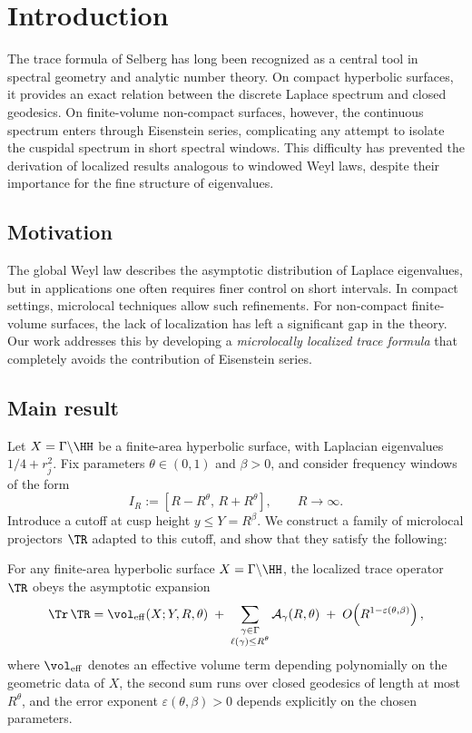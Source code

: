 \section{Introduction}
\label{sec:intro}

The trace formula of Selberg has long been recognized as a central tool in spectral geometry and analytic number theory. 
On compact hyperbolic surfaces, it provides an exact relation between the discrete Laplace spectrum and closed geodesics. 
On finite-volume non-compact surfaces, however, the continuous spectrum enters through Eisenstein series, complicating any attempt to isolate the cuspidal spectrum in short spectral windows. 
This difficulty has prevented the derivation of localized results analogous to windowed Weyl laws, despite their importance for the fine structure of eigenvalues.

\subsection{Motivation}
The global Weyl law describes the asymptotic distribution of Laplace eigenvalues, but in applications one often requires finer control on short intervals. 
In compact settings, microlocal techniques allow such refinements. 
For non-compact finite-volume surfaces, the lack of localization has left a significant gap in the theory. 
Our work addresses this by developing a \emph{microlocally localized trace formula} that completely avoids the contribution of Eisenstein series. 

\subsection{Main result}
Let $X = \Gamma \backslash \HH$ be a finite-area hyperbolic surface, with Laplacian eigenvalues $1/4 + r_j^2$. 
Fix parameters $\theta \in (0,1)$ and $\beta > 0$, and consider frequency windows of the form
\[
  I_R := [R - R^\theta, \, R + R^\theta], 
  \qquad R \to \infty.
\]
Introduce a cutoff at cusp height $y \leq Y = R^\beta$. 
We construct a family of microlocal projectors $\TR$ adapted to this cutoff, and show that they satisfy the following:

\begin{theorem}\label{thm:main}
For any finite-area hyperbolic surface $X = \Gamma \backslash \HH$, the localized trace operator $\TR$ obeys the asymptotic expansion
\[
  \Tr \, \TR = \vol_{\mathrm{eff}}(X;Y,R,\theta) 
  \;+\; \sum_{\substack{\gamma \in \Gamma \\ \ell(\gamma) \leq R^\theta}} 
  \mathcal{A}_\gamma(R,\theta) 
  \;+\; O\!\left( R^{1-\varepsilon(\theta,\beta)} \right),
\]
where $\vol_{\mathrm{eff}}$ denotes an effective volume term depending polynomially on the geometric data of $X$, 
the second sum runs over closed geodesics of length at most $R^\theta$, 
and the error exponent $\varepsilon(\theta,\beta) > 0$ depends explicitly on the chosen parameters.
\end{theorem}

